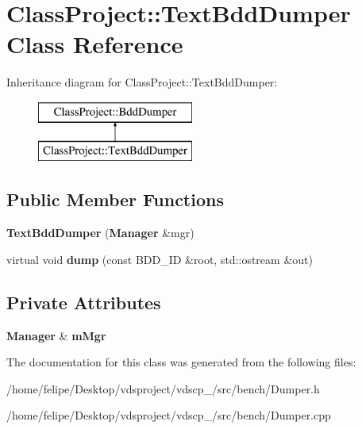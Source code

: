 \section{Class\+Project\+:\+:Text\+Bdd\+Dumper Class Reference}
\label{classClassProject_1_1TextBddDumper}
Inheritance diagram for Class\+Project\+:\+:Text\+Bdd\+Dumper\+:\begin{figure}[H]
\begin{center}
\leavevmode
\includegraphics[height=2.000000cm]{classClassProject_1_1TextBddDumper}
\end{center}
\end{figure}
\subsection*{Public Member Functions}
\begin{DoxyCompactItemize}
\item 
{\bfseries Text\+Bdd\+Dumper} ({\bf Manager} \&mgr)\label{classClassProject_1_1TextBddDumper_ae6d584f67f73ba58ac5a146e9921d2da}

\item 
virtual void {\bfseries dump} (const B\+D\+D\+\_\+\+ID \&root, std\+::ostream \&out)\label{classClassProject_1_1TextBddDumper_a24d38ffd14716206cb8d24937d06876e}

\end{DoxyCompactItemize}
\subsection*{Private Attributes}
\begin{DoxyCompactItemize}
\item 
{\bf Manager} \& {\bfseries m\+Mgr}\label{classClassProject_1_1TextBddDumper_a9c49ecb488d85d0ac8a9f3120a65cead}

\end{DoxyCompactItemize}


The documentation for this class was generated from the following files\+:\begin{DoxyCompactItemize}
\item 
/home/felipe/\+Desktop/vdsproject/vdscp\+\_/src/bench/Dumper.\+h\item 
/home/felipe/\+Desktop/vdsproject/vdscp\+\_/src/bench/Dumper.\+cpp\end{DoxyCompactItemize}
